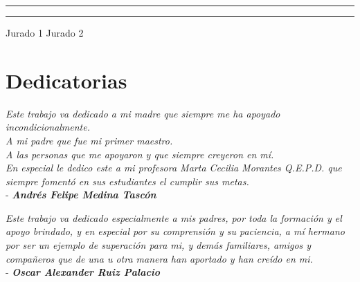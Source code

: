 \documentclass[12pt,letterpaper,openany]{book}
\begin{document}
\vspace*{1.3in}
\rule{60mm}{0.1mm} \hfill \rule{60mm}{0.1mm} \newline
Jurado 1 \hfill Jurado 2

\chapter*{Dedicatorias}
\textit{Este trabajo va dedicado a mi madre que siempre me ha apoyado incondicionalmente. \\
A mi padre que fue mi primer maestro. \\
A las personas que me apoyaron y que siempre creyeron en mí. \\
En especial le dedico este a mi profesora Marta Cecilia Morantes Q.E.P.D. que siempre fomentó en sus estudiantes el cumplir sus metas.\\}
- \hfill \textit{\textbf{Andrés Felipe Medina Tascón}}

\vspace*{1.3in}
\textit{Este trabajo va dedicado especialmente a mis padres, por toda la formación y el apoyo brindado, y en especial por su comprensión y su paciencia, a mí hermano por ser un ejemplo de superación para mi, y demás familiares, amigos y compañeros que de una u otra manera han aportado y han creído en mi.\\}
- \hfill \textit{\textbf{Oscar Alexander Ruiz Palacio}}


\end{document}
